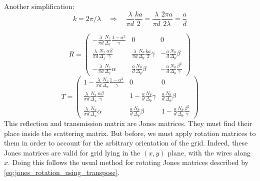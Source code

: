 Another simplification:
\begin{equation}
    k = 2\pi / \lambda
    \quad \Rightarrow \quad
    \frac{\lambda}{\pi d} \frac{ka}{2}
    =
    \frac{\lambda}{\pi d} \frac{2\pi a}{2\lambda}
    =
    \frac{a}{d}
\end{equation}

\begin{equation}
    R =
    \begin{pmatrix}
        -\frac{\lambda}{\pi d}
        \frac{N_x}{\Delta_x}
        \frac{1 - \alpha^2}{\gamma}
        &
        0
        &
        0
        \\
        \frac{\lambda}{\pi d}
        \frac{N_x}{\Delta_x}
        \frac{\alpha \beta}{\gamma}
        &
        \frac{\lambda}{\pi d}
        \frac{N_\theta}{\Delta_\theta}
        \frac{ka}{2}
        \gamma
        &
        -
        \frac{a}{d}
        \frac{N_\theta}{\Delta_\theta}
        \beta
        \\
        -
        \frac{\lambda}{\pi d}
        \frac{N_x}{\Delta_x}
        \alpha
        &
        \frac{a}{d}
        \frac{N_\theta}{\Delta_\theta}
        \beta
        &
        -
        \frac{a}{d}
        \frac{N_\theta}{\Delta_\theta}
        \frac{\beta^2}{\gamma}
    \end{pmatrix}
\end{equation}
\begin{equation}
    T =
    \begin{pmatrix}
        1 -
        \frac{\lambda}{\pi d}
        \frac{N_x}{\Delta_x}
        \frac{1 - \alpha^2}{\gamma}
        &
        0
        &
        0
        \\
        \frac{\lambda}{\pi d}
        \frac{N_x}{\Delta_x}
        \frac{\alpha \beta}{\gamma}
        &
        1 -
        \frac{a}{d}
        \frac{N_\theta}{\Delta_\theta}
        \gamma
        &
        \frac{a}{d}
        \frac{N_\theta}{\Delta_\theta}
        \beta
        \\
        \frac{\lambda}{\pi d}
        \frac{N_x}{\Delta_x}
        \alpha
        &
        \frac{a}{d}
        \frac{N_\theta}{\Delta_\theta}
        \beta
        &
        1 -
        \frac{a}{d}
        \frac{N_\theta}{\Delta_\theta}
        \frac{\beta^2}{\gamma}
    \end{pmatrix}
\end{equation}
This reflection and transmission matrix are Jones matrices.
They must find their place inside the scattering matrix.
But before, we must apply rotation matrices to them in order to account for the arbitrary orientation of the grid.
Indeed, these Jones matrices are valid for grid lying in the $(x, y)$ plane, with the wires along $x$.
Doing this follows the usual method for rotating Jones matrices described by \cref{eq:jones_rotation_using_transpose}.

